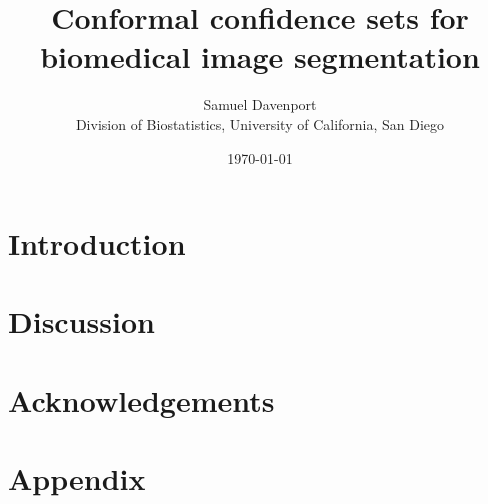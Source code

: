 \documentclass[12pt]{article}
\title{Conformal confidence sets for biomedical image segmentation}
\author{Samuel Davenport\\ \small Division of Biostatistics, University of California, San Diego}
\date{\today}
\theoremstyle{definition}
\begin{document}
	
\maketitle

\begin{abstract}
	
\end{abstract}

\section{Introduction}




\section{Discussion}



\section*{Acknowledgements}







\appendix
\section{Appendix}
\renewcommand{\thefigure}{A\arabic{figure}}

\end{document}
